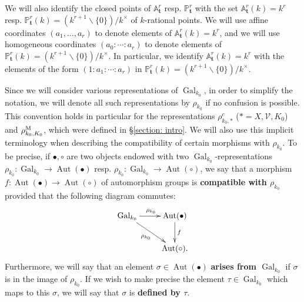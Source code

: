 \documentclass[11pt]{amsart}
\theoremstyle{definition}
\theoremstyle{remark}
\numberwithin{equation}{section}
\DeclareMathOperator{\Aut}{Aut}
\DeclareMathOperator{\Gal}{Gal}
\newcommand{\Abb}{\mathbb{A}}
\newcommand{\Pbb}{\mathbb{P}}
\newcommand{\Vc}{\mathcal{V}}
\newcommand{\tbf}{\mathbf{t}}
\newcommand{\Galk}{{\Gal_{k_0}}}
\begin{document}
We will also identify the closed points of $\Abb^r_\tbf$ resp. $\Pbb^r_\tbf$ with the set $\Abb^r_\tbf(k) = k^r$ resp. $\Pbb^r_\tbf(k) = (k^{r+1} \smallsetminus \{0\})/k^\times$ of $k$-rational points.
We will use affine coordinates $(a_1,\ldots,a_r)$ to denote elements of $\Abb^r_\tbf(k) = k^r$, and we will use homogeneous coordinates $(a_0:\cdots:a_r)$ to denote elements of $\Pbb^r_\tbf(k) = (k^{r+1} \smallsetminus \{0\})/k^\times$.
In particular, we identify $\Abb^r_\tbf(k) = k^r$ with the elements of the form $(1:a_1:\cdots:a_r)$ in $\Pbb^r_\tbf(k) = (k^{r+1} \smallsetminus \{0\})/k^\times$.

Since we will consider various representations of $\Galk$, in order to simplify the notation, we will denote all such representations by $\rho_{k_0}$ if no confusion is possible.
This convention holds in particular for the representations $\rho^c_{k_0,*}$ ($* = X,\Vc,K_0$) and $\rho^{\rm M}_{k_0,K_0}$, which were defined in \S\ref{section: intro}.
We will also use this implicit terminology when describing the compatibility of certain morphisms with $\rho_{k_0}$.
To be precise, if $\bullet,\circ$ are two objects endowed with two $\Galk$-representations $\rho_{k_0} : \Galk \rightarrow \Aut(\bullet)$ resp. $\rho_{k_0} : \Galk \rightarrow \Aut(\circ)$, we say that a morphism $f : \Aut(\bullet) \rightarrow \Aut(\circ)$ of automorphism groups is {\bf compatible with $\rho_{k_0}$} provided that the following diagram commutes:
\[ 
\xymatrix{
  \Galk \ar[r]^{\rho_{k_0}} \ar[dr]_{\rho_{k_0}} & \Aut(\bullet) \ar[d]^f \\
  {} & \Aut(\circ). 
}
\]
Furthermore, we will say that an element $\sigma \in \Aut(\bullet)$ {\bf arises from $\Galk$} if $\sigma$ is in the image of $\rho_{k_0}$.
If we wish to make precise the element $\tau \in \Galk$ which maps to this $\sigma$, we will say that $\sigma$ is {\bf defined by $\tau$}.
\end{document}
